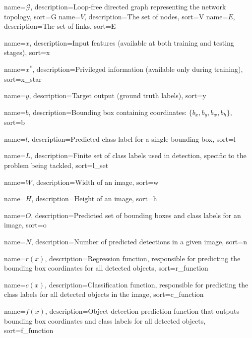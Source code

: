 {
    name=\(\mathcal{G}\),
    description={Loop-free directed graph representing the network topology},
    sort=G
}
{
    name=\(V\),
    description={The set of nodes},
    sort=V
}
{
    name=\(E\),
    description={The set of links},
    sort=E
}


{
    name=\(x\),
    description={Input features (available at both training and testing stages)},
    sort=x
}

{
    name=\(x^*\),
    description={Privileged information (available only during training)},
    sort=x_star
}

{
    name=\(y\),
    description={Target output (ground truth labels)},
    sort=y
}

{
    name=\(b\),
    description={Bounding box containing coordinates: \(\{b_x, b_y, b_w, b_h\}\)},
    sort=b
}

{
    name=\(l\),
    description={Predicted class label for a single bounding box},
    sort=l
}

{
    name=\(L\),
    description={Finite set of class labels used in detection, specific to the problem being tackled},
    sort=l_set
}

{
    name=\(W\),
    description={Width of an image},
    sort=w
}

{
    name=\(H\),
    description={Height of an image},
    sort=h
}

{
    name=\(O\),
    description={Predicted set of bounding boxes and class labels for an image},
    sort=o
}

{
    name=\(N\),
    description={Number of predicted detections in a given image},
    sort=n
}

{
    name=\(r(x)\),
    description={Regression function, responsible for predicting the bounding box coordinates for all detected objects},
    sort=r_function
}

{
    name=\(c(x)\),
    description={Classification function, responsible for predicting the class labels for all detected objects in the image},
    sort=c_function
}

{
    name=\(f(x)\),
    description={Object detection prediction function that outputs bounding box coordinates and class labels for all detected objects},
    sort=f_function
}

